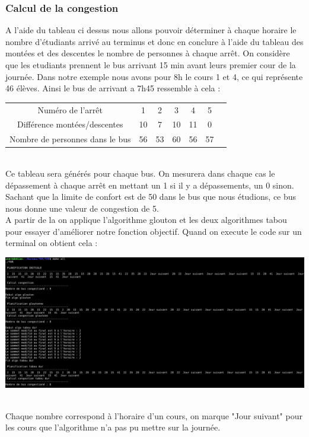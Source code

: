 \documentclass[a4paper,11pt]{article}
\begin{document}
		\subsubsection{Calcul de la congestion}
			A l'aide du tableau ci dessus nous allons pouvoir déterminer à chaque horaire le nombre d'étudiants arrivé au terminus et donc en conclure à l'aide du tableau des montées et des descentes le nombre de personnes à chaque arrêt. 
			On considère que les etudiants prennent le bus arrivant 15 min avant leurs premier cour de la journée.
			Dans notre exemple nous avons pour  8h le cours 1 et 4, ce qui représente 46 élèves. Ainsi le bus de arrivant a 7h45 ressemble à cela :  \\
			\begin{tabular}{ | c | c | c | c | c | c | c |}
 				\hline			
   				Numéro de l'arrêt & 1 & 2 & 3 & 4 & 5\\
   				Différence montées/descentes & 10 & 7 & 10 & 11 & 0\\
   				Nombre de personnes dans le bus & 56 & 53 & 60 & 56 & 57\\
 				\hline  
 			\end{tabular}\\
 			Ce tableau sera générés pour chaque bus. On mesurera dans chaque cas le dépassement à chaque arrêt en mettant un 1 si il y a dépassements, un 0 sinon.
 			Sachant que la limite de confort est de 50 dans le bus que nous étudions, ce bus nous donne une valeur de congestion de 5.\\
 			A partir de la on applique l'algorithme glouton et les deux algorithmes tabou pour essayer d'améliorer notre fonction objectif.
 			Quand on execute le code sur un terminal on obtient cela : \\
 			\centerline{\includegraphics[scale=0.2]{Captures/terminal1.png}}\\
 			Chaque nombre correspond à l'horaire d'un cours, on marque "Jour suivant" pour les cours que l'algorithme n'a pas pu mettre sur la journée.
\end{document}
